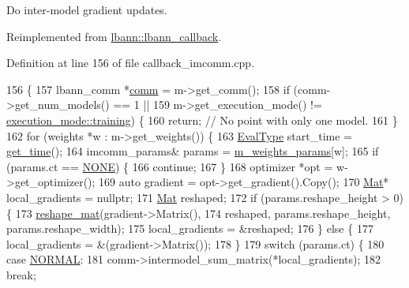 Do inter-\/model gradient updates. 

Reimplemented from \hyperlink{classlbann_1_1lbann__callback_af183624e63ba65e0003fa988f53dee0c}{lbann\+::lbann\+\_\+callback}.



Definition at line 156 of file callback\+\_\+imcomm.\+cpp.


\begin{DoxyCode}
156                                                          \{
157   lbann\_comm *\hyperlink{file__io_8cpp_ab048c6f9fcbcfaa57ce68b00263dbebe}{comm} = m->get\_comm();
158   \textcolor{keywordflow}{if} (comm->get\_num\_models() == 1 ||
159       m->get\_execution\_mode() != \hyperlink{base_8hpp_a2781a159088df64ed7d47cc91c4dc0a8ac185ddac8b5a8f5aa23c5b80bc12d214}{execution\_mode::training}) \{
160     \textcolor{keywordflow}{return};  \textcolor{comment}{// No point with only one model.}
161   \}
162   \textcolor{keywordflow}{for} (weights *w : m->get\_weights()) \{
163     \hyperlink{base_8hpp_a3266f5ac18504bbadea983c109566867}{EvalType} start\_time = \hyperlink{namespacelbann_a478d36031ff0659893c4322cd856157f}{get\_time}();
164     imcomm\_params& params = \hyperlink{classlbann_1_1lbann__callback__imcomm_a32a0319c91aff324cb3468de4f31dd50}{m\_weights\_params}[w];
165     \textcolor{keywordflow}{if} (params.ct == \hyperlink{classlbann_1_1lbann__callback__imcomm_acf7e894b3381e7f9b71020dc73594d6aafa59156bc4d5bcbf6bd80918d062da03}{NONE}) \{
166       \textcolor{keywordflow}{continue};
167     \}
168     optimizer *opt = w->get\_optimizer();
169     \textcolor{keyword}{auto} gradient = opt->get\_gradient().Copy();
170     \hyperlink{base_8hpp_a68f11fdc31b62516cb310831bbe54d73}{Mat}* local\_gradients = \textcolor{keyword}{nullptr};
171     \hyperlink{base_8hpp_a68f11fdc31b62516cb310831bbe54d73}{Mat} reshaped;
172     \textcolor{keywordflow}{if} (params.reshape\_height > 0) \{
173       \hyperlink{classlbann_1_1lbann__callback__imcomm_a13fe710b841f72e28daf8de029f6c2f9}{reshape\_mat}(gradient->Matrix(),
174                   reshaped, params.reshape\_height, params.reshape\_width);
175       local\_gradients = &reshaped;
176     \} \textcolor{keywordflow}{else} \{
177       local\_gradients = &(gradient->Matrix());
178     \}
179     \textcolor{keywordflow}{switch} (params.ct) \{
180     \textcolor{keywordflow}{case} \hyperlink{classlbann_1_1lbann__callback__imcomm_acf7e894b3381e7f9b71020dc73594d6aa5f19efb5bef79cea24be992a2137962e}{NORMAL}:
181       comm->intermodel\_sum\_matrix(*local\_gradients);
182       \textcolor{keywordflow}{break};

\end{DoxyCode}
